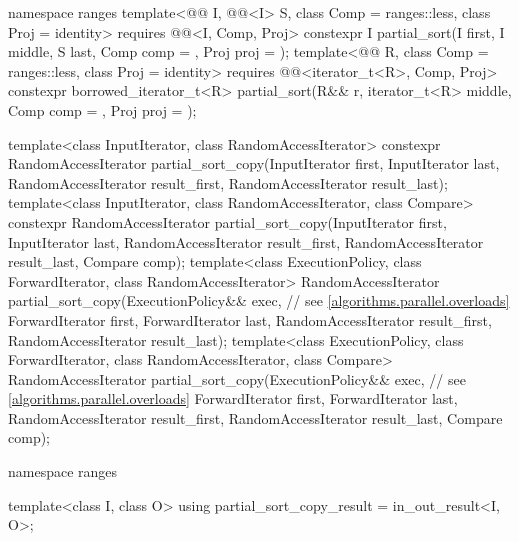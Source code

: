 \begin{codeblock}
{  namespace ranges {
    template<@@ I, @@<I> S, class Comp = ranges::less,
             class Proj = identity>
      requires @@<I, Comp, Proj>
      constexpr I
        partial_sort(I first, I middle, S last, Comp comp = {}, Proj proj = {});
    template<@@ R, class Comp = ranges::less, class Proj = identity>
      requires @@<iterator_t<R>, Comp, Proj>
      constexpr borrowed_iterator_t<R>
        partial_sort(R&& r, iterator_t<R> middle, Comp comp = {},
                     Proj proj = {});
  }

  template<class InputIterator, class RandomAccessIterator>
    constexpr RandomAccessIterator
      partial_sort_copy(InputIterator first, InputIterator last,
                        RandomAccessIterator result_first,
                        RandomAccessIterator result_last);
  template<class InputIterator, class RandomAccessIterator, class Compare>
    constexpr RandomAccessIterator
      partial_sort_copy(InputIterator first, InputIterator last,
                        RandomAccessIterator result_first,
                        RandomAccessIterator result_last,
                        Compare comp);
  template<class ExecutionPolicy, class ForwardIterator, class RandomAccessIterator>
    RandomAccessIterator
      partial_sort_copy(ExecutionPolicy&& exec,                 // see \ref{algorithms.parallel.overloads}
                        ForwardIterator first, ForwardIterator last,
                        RandomAccessIterator result_first,
                        RandomAccessIterator result_last);
  template<class ExecutionPolicy, class ForwardIterator, class RandomAccessIterator,
           class Compare>
    RandomAccessIterator
      partial_sort_copy(ExecutionPolicy&& exec,                 // see \ref{algorithms.parallel.overloads}
                        ForwardIterator first, ForwardIterator last,
                        RandomAccessIterator result_first,
                        RandomAccessIterator result_last,
                        Compare comp);

  namespace ranges {
    template<class I, class O>
      using partial_sort_copy_result = in_out_result<I, O>;

}}
\end{codeblock}
